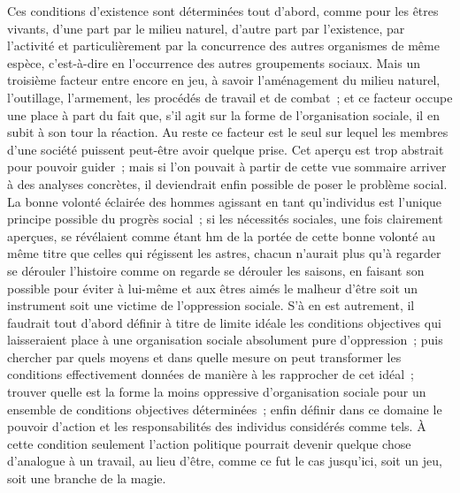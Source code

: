 \documentclass[french,twoside]{book} %
\begin{document}
Ces conditions d'existence sont déterminées tout d'abord, comme pour les êtres vivants, d'une part par le milieu naturel, d'autre part par l'existence, par l'activité et particulièrement par la concurrence des autres organismes de même espèce, c'est-à-dire en l'occurrence des autres groupements sociaux. Mais un troisième facteur entre encore en jeu, à savoir l'aménagement du milieu naturel, l'outillage, l'armement, les procédés de travail et de combat ; et ce facteur occupe une place à part du fait que, s'il agit sur la forme de l'organisation sociale, il en subit à son tour la réaction. Au reste ce facteur est le seul sur lequel les membres d'une société puissent peut-être avoir quelque prise. Cet aperçu est trop abstrait pour pouvoir guider ; mais si l'on pouvait à partir de cette vue sommaire arriver à des analyses concrètes, il deviendrait enfin possible de poser le problème social. La bonne volonté éclairée des hommes agissant en tant qu'individus est l'unique principe possible du progrès social ; si les nécessités sociales, une fois clairement aperçues, se révélaient comme étant hm de la portée de cette bonne volonté au même titre que celles qui régissent les astres, chacun n'aurait plus qu'à regarder se dérouler l'histoire comme on regarde se dérouler les saisons, en faisant son possible pour éviter à lui-même et aux êtres aimés le malheur d'être soit un instrument soit une victime de l'oppression sociale. S'à en est autrement, il faudrait tout d'abord définir à titre de limite idéale les conditions objectives qui laisseraient place à une organisation sociale absolument pure d'oppression ; puis chercher par quels moyens et dans quelle mesure on peut transformer les conditions effectivement données de manière à les rapprocher de cet idéal ; trouver quelle est la forme la moins oppressive d'organisation sociale pour un ensemble de conditions objectives déterminées ; enfin définir dans ce domaine le pouvoir d'action et les responsabilités des individus considérés comme tels. À cette condition seulement l'action politique pourrait devenir quelque chose d'analogue à un travail, au lieu d'être, comme ce fut le cas jusqu'ici, soit un jeu, soit une branche de la magie.\par
\end{document}

